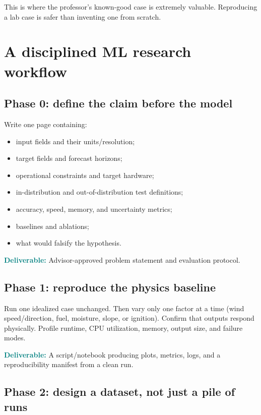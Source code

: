 \documentclass[11pt]{article}
\newcommand{\deliverable}[1]{\textcolor{teal}{\textbf{Deliverable:}} #1}
\begin{document}
This is where the professor's known-good case is extremely valuable. Reproducing a lab case is safer than inventing one from scratch.

\section{A disciplined ML research workflow}

\subsection{Phase 0: define the claim before the model}

Write one page containing:
\begin{itemize}
  \item input fields and their units/resolution;
  \item target fields and forecast horizons;
  \item operational constraints and target hardware;
  \item in-distribution and out-of-distribution test definitions;
  \item accuracy, speed, memory, and uncertainty metrics;
  \item baselines and ablations;
  \item what would falsify the hypothesis.
\end{itemize}

\deliverable{Advisor-approved problem statement and evaluation protocol.}

\subsection{Phase 1: reproduce the physics baseline}

Run one idealized case unchanged. Then vary only one factor at a time (wind speed/direction, fuel, moisture, slope, or ignition). Confirm that outputs respond physically. Profile runtime, CPU utilization, memory, output size, and failure modes.

\deliverable{A script/notebook producing plots, metrics, logs, and a reproducibility manifest from a clean run.}

\subsection{Phase 2: design a dataset, not just a pile of runs}
\end{document}
